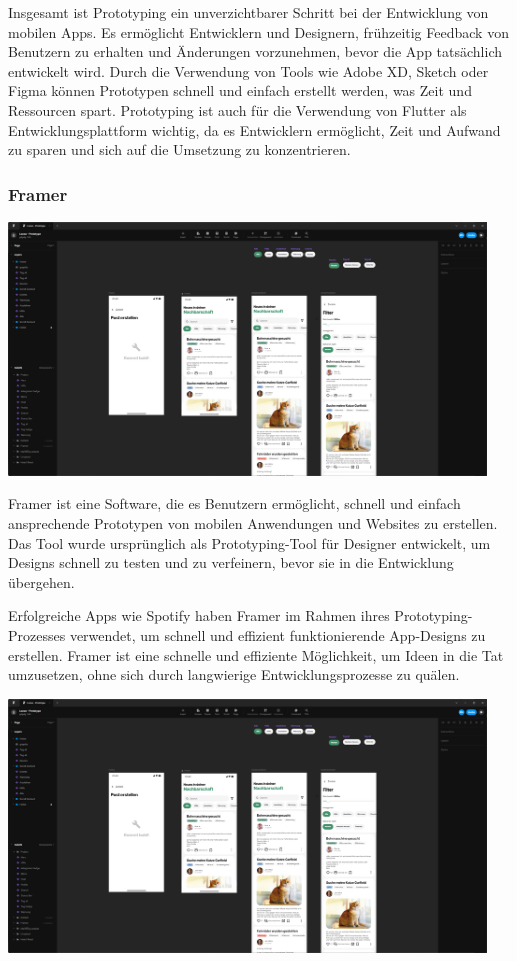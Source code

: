 Insgesamt ist Prototyping ein unverzichtbarer Schritt bei der Entwicklung von mobilen Apps. Es ermöglicht Entwicklern und Designern, frühzeitig Feedback von Benutzern zu erhalten und Änderungen vorzunehmen, bevor die App tatsächlich entwickelt wird. Durch die Verwendung von Tools wie Adobe XD, Sketch oder Figma können Prototypen schnell und einfach erstellt werden, was Zeit und Ressourcen spart. Prototyping ist auch für die Verwendung von Flutter als Entwicklungsplattform wichtig, da es Entwicklern ermöglicht, Zeit und Aufwand zu sparen und sich auf die Umsetzung zu konzentrieren.
\subsubsection{Framer}
\includegraphics[width=0.95\textwidth]{pics/nochba-framer-prototype-screenshot.png}


Framer ist eine Software, die es Benutzern ermöglicht, schnell und einfach ansprechende Prototypen von mobilen Anwendungen und Websites zu erstellen. Das Tool wurde ursprünglich als Prototyping-Tool für Designer entwickelt, um Designs schnell zu testen und zu verfeinern, bevor sie in die Entwicklung übergehen.

Erfolgreiche Apps wie Spotify haben Framer im Rahmen ihres
Prototyping-Prozesses verwendet, um schnell und effizient
funktionierende App-Designs zu erstellen. Framer ist eine
schnelle und effiziente Möglichkeit, um Ideen in die Tat
umzusetzen, ohne sich durch langwierige Entwicklungsprozesse
zu quälen.

\includegraphics[width=0.95\textwidth]{pics/nochba-framer-prototype-screenshot.png}


